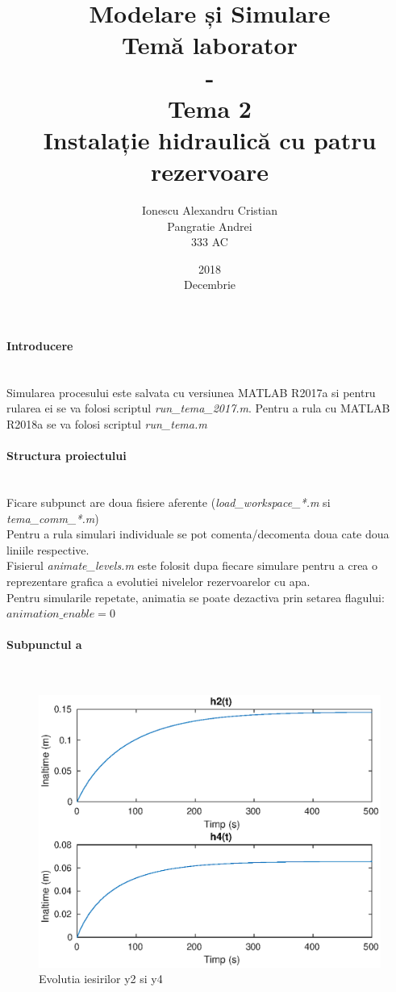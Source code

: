 \documentclass[12pt,english]{article}
\title{Modelare și Simulare\\Temă laborator\\-\\Tema 2\\Instalație hidraulică cu patru rezervoare}
\date{2018\\Decembrie}
\author{Ionescu Alexandru Cristian\\Pangratie Andrei\\333 AC}
\newcommand{\myparagraph}[1]{\paragraph{#1}\mbox{}\\}
\begin{document}
\maketitle

\pagebreak


\myparagraph {Introducere}
Simularea procesului este salvata cu versiunea MATLAB R2017a si pentru rularea ei se va folosi scriptul \textit{run\_tema\_2017.m}. Pentru a rula cu MATLAB R2018a se va folosi scriptul \textit{run\_tema.m}

\myparagraph {Structura proiectului}
Ficare subpunct are doua fisiere aferente (\textit{load\_workspace\_*.m} si \textit{tema\_comm\_*.m}) \\
Pentru a rula simulari individuale se pot comenta/decomenta doua cate doua liniile respective.\\
Fisierul \textit{animate\_levels.m} este folosit dupa fiecare simulare pentru a crea o reprezentare grafica a evolutiei nivelelor rezervoarelor cu apa.\\
Pentru simularile repetate, animatia se poate dezactiva prin setarea flagului: $animation\_enable = 0$

% 



\myparagraph {Subpunctul a}

\begin{center}
	\begin{figure} [htbp]
		\includegraphics[width=1\textwidth]{a_2.eps}
		\caption{Evolutia iesirilor y2 si y4}
	\end{figure}
\end{center}
\end{document}
